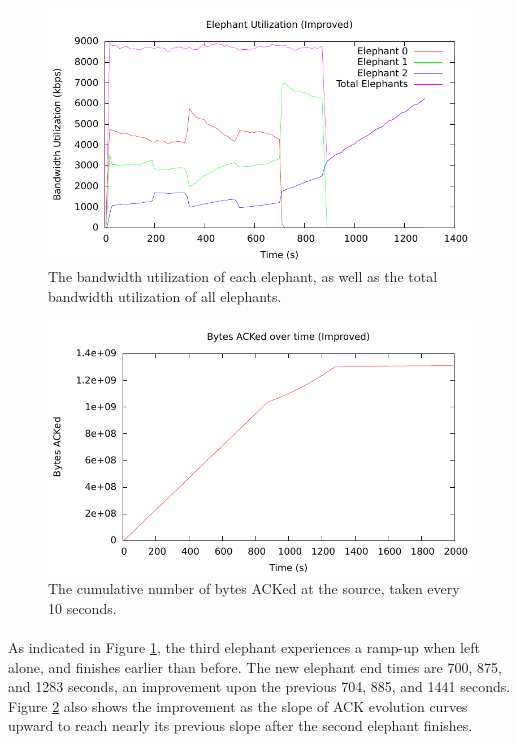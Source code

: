 \documentclass{article}
\begin{document}
      \begin{figure}[h]
        \begin{center}
          \includegraphics{elephant_bw_new}
          \caption{The bandwidth utilization of each elephant, as well as the total bandwidth utilization of all elephants.}
          \label{fig:elephant_bw_new}
        \end{center}
      \end{figure}

      \begin{figure}[h]
        \begin{centering}
          \includegraphics{ack_plot_new}
          \caption{The cumulative number of bytes ACKed at the source, taken every 10 seconds.}
          \label{fig:ack_plot_new}
        \end{centering}
      \end{figure}

      \paragraph{}
        As indicated in Figure \ref{fig:elephant_bw_new}, the third elephant experiences a ramp-up when left alone, and finishes earlier than before.
        The new elephant end times are 700, 875, and 1283 seconds, an improvement upon the previous 704, 885, and 1441 seconds.
        Figure \ref{fig:ack_plot_new} also shows the improvement as the slope of ACK evolution curves upward to reach nearly its previous slope after the second elephant finishes.
\end{document}
